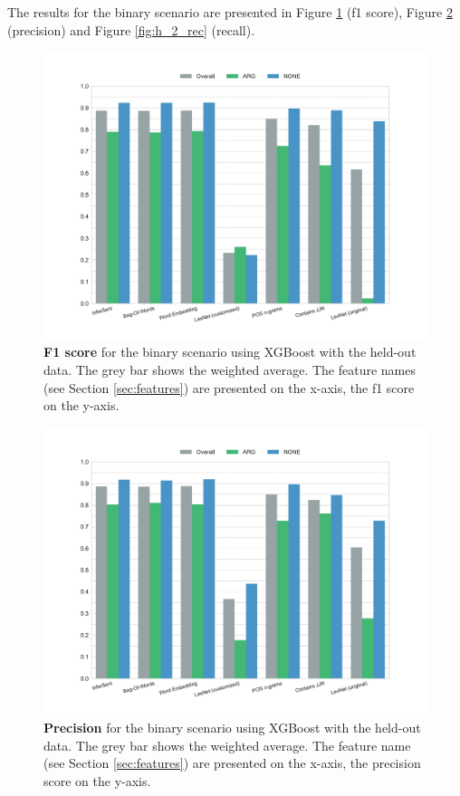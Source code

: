 \FloatBarrier

The results for the binary scenario are presented in Figure \ref{fig:h_2_f1} (f1 score), Figure \ref{fig:h_2_prec} (precision) and Figure \ref{fig:h_2_rec} (recall).

\begin{figure}[htbp]
         \caption{\textbf{F1 score} for the binary scenario using XGBoost with the held-out data. The grey bar shows the weighted average. The feature names (see Section \ref{sec:features}) are presented on the x-axis, the f1 score on the y-axis.} 
    \label{fig:h_2_f1}
    \centering
	\includegraphics[width=0.9\linewidth]{images/heldout/h-f1-True}
    \end{figure}


\begin{figure}[htbp]
         \caption{\textbf{Precision} for the binary scenario using XGBoost with the held-out data. The grey bar shows the weighted average. The feature name (see Section \ref{sec:features}) are presented on the x-axis, the precision score on the y-axis.} 
    \label{fig:h_2_prec}
    \centering
	\includegraphics[width=0.9\linewidth]{images/heldout/h-precision-True}
    \end{figure}
    

